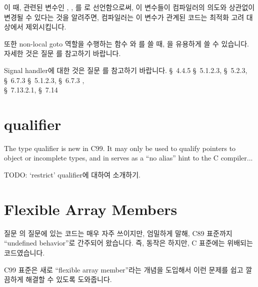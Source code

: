 \begin{faq}
        이 때, 관련된 변수인 , , 를 로
        선언함으로써, 이 변수들이 컴파일러의 의도와 상관없이 변경될 수 있다는
        것을 알려주면, 컴파일러는 이 변수가 관계된 코드는 최적화 고려 대상에서
        제외시킵니다.

        또한 non-local goto 역할을 수행하는 함수 와 를
        쓸 때, 을 유용하게 쓸 수 있습니다. 자세한 것은
        질문 를 참고하기 바랍니다.

        Signal handler에 대한 것은 질문 를 참고하기 바랍니다.
\R
	\cite{hs5} \S\ 4.4.5
        \cite{rational2} \S\ 5.1.2.3, \S\ 5.2.3, \S\ 6.7.3
        \cite{c99} \S\ 5.1.2.3, \S\ 6.7.3 , \\
                   \S\ 7.13.2.1, \S\ 7.14
\end{faq}


\section{ qualifier}
The type qualifier  is new in C99. 
It may only be used to qualify pointers to object or incomplete types, and in
serves as a ``no alias'' hint to the C compiler...

TODO: `restrict' qualifier에 대하여 소개하기.

\section{Flexible Array Members}
질문 의 질문에 있는 코드는 매우 자주 쓰이지만, 엄밀하게 말해,
C89 표준까지 ``undefined behavior''로 간주되어 왔습니다. 즉, 동작은 하지만,
C 표준에는 위배되는 코드였습니다.

C99 표준은 새로 ``flexible array member''라는 개념을 도입해서 이런 문제를
쉽고 깔끔하게 해결할 수 있도록 도와줍니다.

